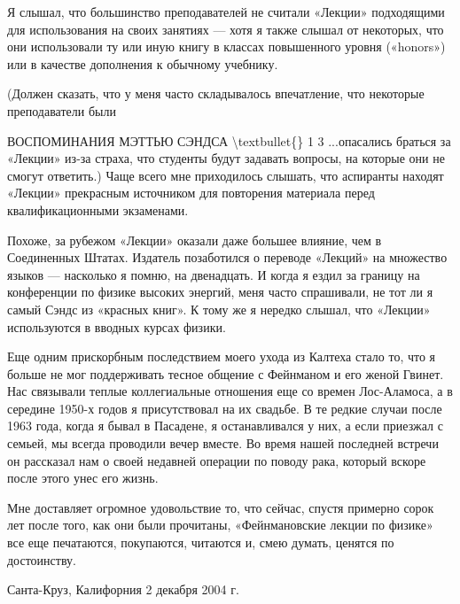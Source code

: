\documentclass[10pt,oneside]{article}
\begin{document}
Я слышал, что большинство преподавателей не считали «Лекции» подходящими для использования на своих занятиях --- хотя я также слышал от некоторых, что они использовали ту или иную книгу в классах повышенного уровня («honors») или в качестве дополнения к обычному учебнику.\par

(Должен сказать, что у меня часто складывалось впечатление, что некоторые преподаватели были\par

ВОСПОМИНАНИЯ МЭТТЬЮ СЭНДСА \textbackslash{}textbullet\{\} 1 3 ...опасались браться за «Лекции» из-за страха, что студенты будут задавать вопросы, на которые они не смогут ответить.) Чаще всего мне приходилось слышать, что аспиранты находят «Лекции» прекрасным источником для повторения материала перед квалификационными экзаменами.\par

Похоже, за рубежом «Лекции» оказали даже большее влияние, чем в Соединенных Штатах. Издатель позаботился о переводе «Лекций» на множество языков --- насколько я помню, на двенадцать. И когда я ездил за границу на конференции по физике высоких энергий, меня часто спрашивали, не тот ли я самый Сэндс из «красных книг». К тому же я нередко слышал, что «Лекции» используются в вводных курсах физики.\par

Еще одним прискорбным последствием моего ухода из Калтеха стало то, что я больше не мог поддерживать тесное общение с Фейнманом и его женой Гвинет. Нас связывали теплые коллегиальные отношения еще со времен Лос-Аламоса, а в середине 1950-х годов я присутствовал на их свадьбе. В те редкие случаи после 1963 года, когда я бывал в Пасадене, я останавливался у них, а если приезжал с семьей, мы всегда проводили вечер вместе. Во время нашей последней встречи он рассказал нам о своей недавней операции по поводу рака, который вскоре после этого унес его жизнь.\par

Мне доставляет огромное удовольствие то, что сейчас, спустя примерно сорок лет после того, как они были прочитаны, «Фейнмановские лекции по физике» все еще печатаются, покупаются, читаются и, смею думать, ценятся по достоинству.\par

Санта-Круз, Калифорния 2 декабря 2004 г.\par

\clearpage
{}
\end{document}
